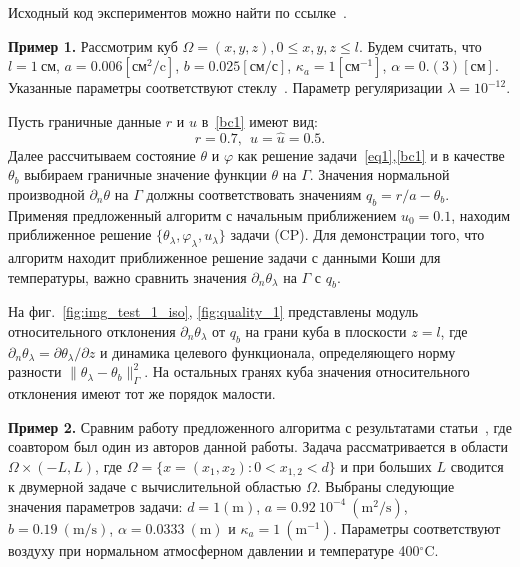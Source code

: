 \documentclass[12pt]{article}
\begin{document}
    Исходный код экспериментов можно найти по ссылке~\cite{mesenev-github}.

    \textbf{Пример 1.}
    Рассмотрим куб $\Omega = {(x, y, z), 0 \leq x,y,z \leq l}$.
    Будем считать, что $l=1~\text{см}$, $a = 0.006[\text{см}^2/\text{c}]$,
    $b=0.025[\text{см}/\text{с}]$, $\kappa_a=1[\text{см}^{-1}]$, $\alpha = 0.(3)[\text{см}]$.
    Указанные параметры соответствуют стеклу~\cite{Grenkin5}.
    Параметр регуляризации $\lambda=10^{-12}.$

    Пусть граничные данные $r$ и $u$ в~\eqref{bc1} имеют вид:
    $$
        r = 0.7,\:\:
        u = \hat u = 0.5.
    $$
    Далее рассчитываем состояние $\theta$ и $\varphi$ как решение
    задачи~\eqref{eq1},\eqref{bc1} и в качестве $\theta_b$ выбираем
    граничные значение функции $\theta$ на $\Gamma$.
    Значения нормальной производной $\partial_n\theta$ на $\Gamma$
    должны соответствовать значениям $q_b=r/a-\theta_b$.
    Применяя предложенный алгоритм с начальным приближением $u_0 = 0.1$, находим приближенное решение
    $\{\theta_\lambda, \varphi_\lambda, u_\lambda\}$ задачи (CP).
    Для демонстрации того, что алгоритм находит приближенное решение задачи с данными
    Коши для температуры, важно сравнить значения $\partial_n\theta_\lambda$ на $\Gamma$ с $q_b.$

    На фиг.~\ref{fig:img_test_1_iso}, \ref{fig:quality_1} представлены модуль относительного
    отклонения $\partial_n\theta_\lambda$ от $q_b$ на грани куба в плоскости $z=l$,
    где $\partial_n\theta_\lambda=\partial\theta_\lambda/\partial z$ и
    динамика целевого функционала, определяющего норму
    разности $\|\theta_\lambda -\theta_b\|^2_\Gamma$.
    На остальных гранях куба значения относительного отклонения имеют тот же порядок малости.

  

    \textbf{Пример 2.}
    Сравним работу предложенного алгоритма с результатами статьи~\cite{CNSNS19},
    где соавтором был один из авторов данной работы.
    Задача рассматривается в области $\Omega \times (-L,L)$,
    где $\Omega = \{ x = (x_1,x_2) \colon 0 < x_{1,2} < d\}$
    и при больших $L$ сводится к двумерной задаче с вычислительной областью $\Omega$.
    Выбраны следующие значения параметров задачи:
    $d = \mathrm{1(m)}$, $a = 0.92~10^{-4}~\mathrm{(m^2/s)}$, $b= 0.19~\mathrm{(m/s)}$,
    $\alpha = 0.0333~\mathrm{(m)}$ и $\kappa_a = 1~\mathrm{(m^{-1})}$.
    Параметры соответствуют воздуху при нормальном атмосферном давлении и температуре 400$^\circ$C\@.
\end{document}
